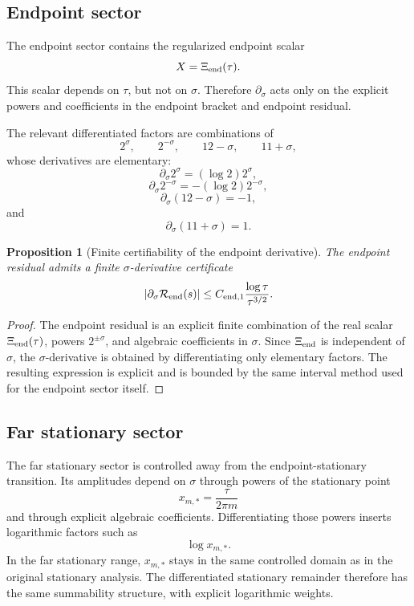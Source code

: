 \documentclass[11pt]{article}
\newtheorem{proposition}[theorem]{Proposition}
\begin{document}
\subsection{Endpoint sector}

The endpoint sector contains the regularized endpoint scalar
\[
        X=\Xi_{\rm end}(\tau).
\]
This scalar depends on \(\tau\), but not on \(\sigma\).  Therefore
\(\partial_\sigma\) acts only on the explicit powers and coefficients in the
endpoint bracket and endpoint residual.

The relevant differentiated factors are combinations of
\[
        2^\sigma,
        \qquad
        2^{-\sigma},
        \qquad
        12-\sigma,
        \qquad
        11+\sigma,
\]
whose derivatives are elementary:
\[
        \partial_\sigma 2^\sigma=(\log2)2^\sigma,
\]
\[
        \partial_\sigma 2^{-\sigma}=-(\log2)2^{-\sigma},
\]
\[
        \partial_\sigma(12-\sigma)=-1,
\]
and
\[
        \partial_\sigma(11+\sigma)=1.
\]

\begin{proposition}[Finite certifiability of the endpoint derivative]
\label{prop:endpoint-derivative-certifiable}
The endpoint residual admits a finite \(\sigma\)-derivative certificate
\[
        |\partial_\sigma\mathcal R_{\rm end}(s)|
        \le
        C_{{\rm end},1}
        \frac{\log\tau}{\tau^{3/2}}.
\]
\end{proposition}

\begin{proof}
The endpoint residual is an explicit finite combination of the real scalar
\(\Xi_{\rm end}(\tau)\), powers \(2^{\pm\sigma}\), and algebraic coefficients
in \(\sigma\).  Since \(\Xi_{\rm end}\) is independent of \(\sigma\), the
\(\sigma\)-derivative is obtained by differentiating only elementary factors.
The resulting expression is explicit and is bounded by the same interval
method used for the endpoint sector itself.
\end{proof}

\subsection{Far stationary sector}

The far stationary sector is controlled away from the endpoint-stationary
transition.  Its amplitudes depend on \(\sigma\) through powers of the
stationary point
\[
        x_{m,*}
        =
        \frac{\tau}{2\pi m}
\]
and through explicit algebraic coefficients.  Differentiating those powers
inserts logarithmic factors such as
\[
        \log x_{m,*}.
\]
In the far stationary range, \(x_{m,*}\) stays in the same controlled domain as
in the original stationary analysis.  The differentiated stationary remainder
therefore has the same summability structure, with explicit logarithmic
weights.
\end{document}
